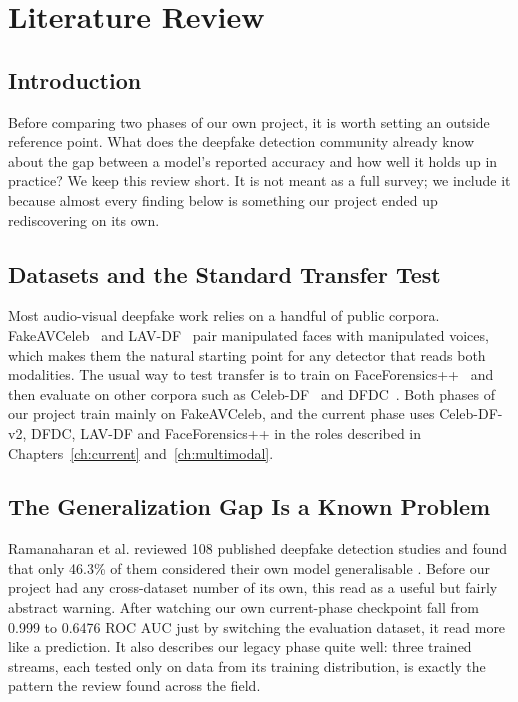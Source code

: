 \chapter{Literature Review}
\label{ch:literature}

\section{Introduction}

Before comparing two phases of our own project, it is worth setting an outside
reference point. What does the deepfake detection community already know about
the gap between a model's reported accuracy and how well it holds up in
practice? We keep this review short. It is not meant as a full survey; we
include it because almost every finding below is something our project ended up
rediscovering on its own.

\section{Datasets and the Standard Transfer Test}

Most audio-visual deepfake work relies on a handful of public corpora.
FakeAVCeleb~\cite{fakeavceleb} and LAV-DF~\cite{lavdf} pair manipulated faces
with manipulated voices, which makes them the natural starting point for any
detector that reads both modalities. The usual way to test transfer is to train
on FaceForensics++~\cite{ffpp} and then evaluate on other corpora such as
Celeb-DF~\cite{celebdf} and DFDC~\cite{dfdc}. Both phases of our project train
mainly on FakeAVCeleb, and the current phase uses Celeb-DF-v2, DFDC, LAV-DF and
FaceForensics++ in the roles described in Chapters~\ref{ch:current}
and~\ref{ch:multimodal}.

\section{The Generalization Gap Is a Known Problem}

Ramanaharan et al. reviewed 108 published deepfake detection studies and found
that only 46.3\% of them considered their own model generalisable
\cite{ramanaharan2025}. Before our project had any cross-dataset number of its
own, this read as a useful but fairly abstract warning. After watching our own
current-phase checkpoint fall from 0.999 to 0.6476 ROC AUC just by switching
the evaluation dataset, it read more like a prediction. It also describes our
legacy phase quite well: three trained streams, each tested only on data from
its training distribution, is exactly the pattern the review found across the
field.

